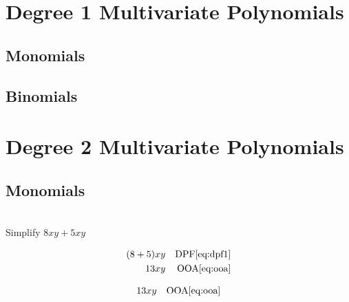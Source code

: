 \section*{Degree 1 Multivariate Polynomials}

\subsection*{Monomials}

\subsection*{Binomials}

\section*{Degree 2 Multivariate Polynomials}

\subsection*{Monomials}

\begin{example}[id:20141106-150953] \label{20141106-150953}  \hfill \\

Simplify $8xy+5xy$

\soln

\solnsteps
\begin{align*}
(8+5)xy && \text{DPF} \eqref{eq:dpf1} \\
13xy && \text{OOA} \eqref{eq:ooa} 
\end{align*}

\soln

\lesssteps
\begin{align*}
13xy && \text{OOA} \eqref{eq:ooa} 
\end{align*}

\end{example}

